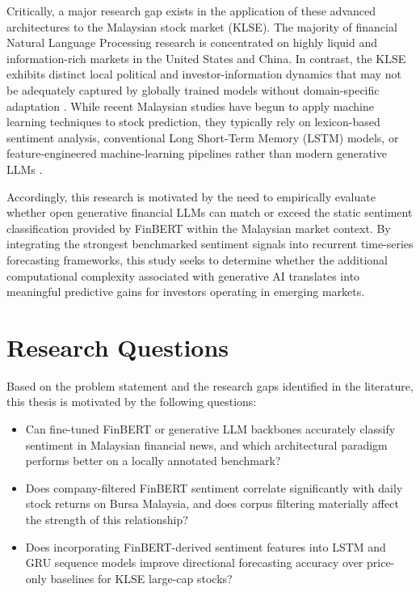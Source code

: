 \documentclass[12pt]{ucetd}
\begin{document}
Critically, a major research gap exists in the application of these advanced architectures to the Malaysian stock market (KLSE). The majority of financial Natural Language Processing research is concentrated on highly liquid and information-rich markets in the United States and China. In contrast, the KLSE exhibits distinct local political and investor-information dynamics that may not be adequately captured by globally trained models without domain-specific adaptation \cite{cheng2019malaysian, tan2025klse}. While recent Malaysian studies have begun to apply machine learning techniques to stock prediction, they typically rely on lexicon-based sentiment analysis, conventional Long Short-Term Memory (LSTM) models, or feature-engineered machine-learning pipelines rather than modern generative LLMs \cite{leong2021stock, tengku2022prediction, sidek2023bursa, chia2023predictive}.

Accordingly, this research is motivated by the need to empirically evaluate whether open generative financial LLMs can match or exceed the static sentiment classification provided by FinBERT within the Malaysian market context. By integrating the strongest benchmarked sentiment signals into recurrent time-series forecasting frameworks, this study seeks to determine whether the additional computational complexity associated with generative AI translates into meaningful predictive gains for investors operating in emerging markets.

\section{Research Questions}

Based on the problem statement and the research gaps identified in the literature, this thesis is motivated by the following questions:

\begin{itemize}
    \item Can fine-tuned FinBERT or generative LLM backbones accurately classify sentiment in Malaysian financial news, and which architectural paradigm performs better on a locally annotated benchmark?
    \item Does company-filtered FinBERT sentiment correlate significantly with daily stock returns on Bursa Malaysia, and does corpus filtering materially affect the strength of this relationship?
    \item Does incorporating FinBERT-derived sentiment features into LSTM and GRU sequence models improve directional forecasting accuracy over price-only baselines for KLSE large-cap stocks?
\end{itemize}
\end{document}
